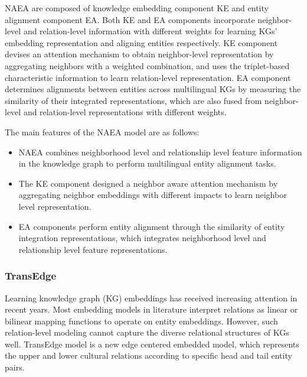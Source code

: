 \documentclass[sigconf]{acmart}
\begin{document}
{NAEA are composed of knowledge embedding component KE and entity alignment component EA. Both KE and EA components incorporate neighbor-level and relation-level information with different weights for learning KGs’ embedding representation and aligning entities respectively. KE component devises an attention mechanism to obtain neighbor-level representation by aggregating neighbors with a weighted combination, and uses the triplet-based characteristic information to learn relation-level representation. EA component determines alignments between entities across multilingual KGs by measuring the similarity of their integrated representations, which are also fused from neighbor-level and relation-level representations with different weights.

The main features of the NAEA model are as follows:
\begin{itemize}
\item NAEA combines neighborhood level and relationship level feature information in the knowledge graph to perform multilingual entity alignment tasks.
\item The KE component designed a neighbor aware attention mechanism by aggregating neighbor embeddings with different impacts to learn neighbor level representation.
\item EA components perform entity alignment through the similarity of entity integration representations, which integrates neighborhood level and relationship level feature representations.
\end{itemize}

\subsubsection{TransEdge \cite{sun2019transedge}}

Learning knowledge graph (KG) embeddings has received increasing attention in recent years. Most embedding models in literature interpret relations as linear or bilinear mapping functions to operate on entity embeddings. However, such relation-level modeling cannot capture the diverse relational structures of KGs well. TransEdge model is a new edge centered embedded model, which represents the upper and lower cultural relations according to specific head and tail entity pairs. 

}
\end{document}
